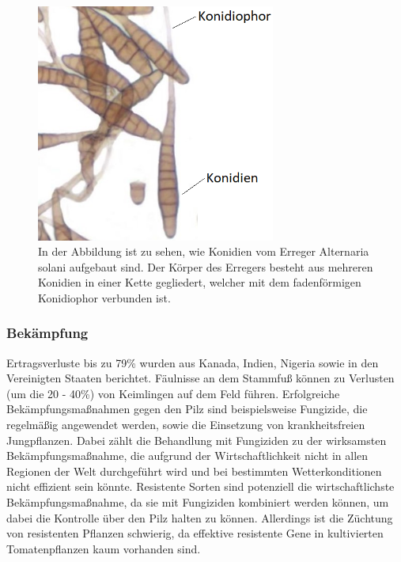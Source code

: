  
\begin{figure}[h!]
	\centering
	\includegraphics[width=0.7\textwidth]{bilder/konidien.png}
	\caption{In der Abbildung ist zu sehen, wie Konidien vom Erreger Alternaria solani aufgebaut sind. Der Körper des Erregers besteht aus mehreren Konidien in einer Kette gegliedert, welcher mit dem fadenförmigen Konidiophor verbunden ist\cite{konidien}.}
	\label{konidien}
\end{figure}

\subsubsection{Bekämpfung}

Ertragsverluste bis zu 79\% wurden aus Kanada, Indien, Nigeria sowie in den Vereinigten Staaten berichtet. Fäulnisse an dem Stammfuß können zu Verlusten (um die 20 - 40\%) von Keimlingen auf dem Feld führen. Erfolgreiche Bekämpfungsmaßnahmen gegen den Pilz sind beispielsweise Fungizide, die regelmäßig angewendet werden, sowie die Einsetzung von krankheitsfreien Jungpflanzen. Dabei zählt die Behandlung mit Fungiziden zu der wirksamsten Bekämpfungsmaßnahme, die aufgrund der Wirtschaftlichkeit nicht in allen Regionen der Welt durchgeführt wird und bei bestimmten Wetterkonditionen nicht effizient sein könnte. Resistente Sorten sind potenziell die wirtschaftlichste Bekämpfungsmaßnahme, da sie mit Fungiziden kombiniert werden können, um dabei die Kontrolle über den Pilz halten zu können. Allerdings ist die Züchtung von resistenten Pflanzen schwierig, da effektive resistente Gene in kultivierten Tomatenpflanzen kaum vorhanden sind\cite{solani}.

